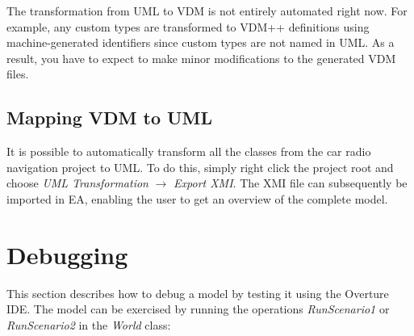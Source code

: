 


The transformation from UML to VDM is not entirely automated right now. For
example, any custom types are transformed to VDM++ definitions using
machine-generated identifiers since custom types are not named in
UML. As a result, you have to expect to make minor modifications to
the generated VDM files. 

\subsection{Mapping VDM to UML}

It is possible to automatically transform all the classes from the car
radio navigation project to UML. To do this, simply right
click the project root and choose \emph{UML Transformation} $
\rightarrow $ \emph{Export XMI}. The XMI file can subsequently be
imported in EA, enabling the user to get an overview
of the complete model.

\section{Debugging}\label{sec:debugging}

This section describes how to debug a model by testing it using the
Overture IDE. The model can be exercised by running the operations
\emph{RunScenario1} or \emph{RunScenario2} in the \emph{World} class:

